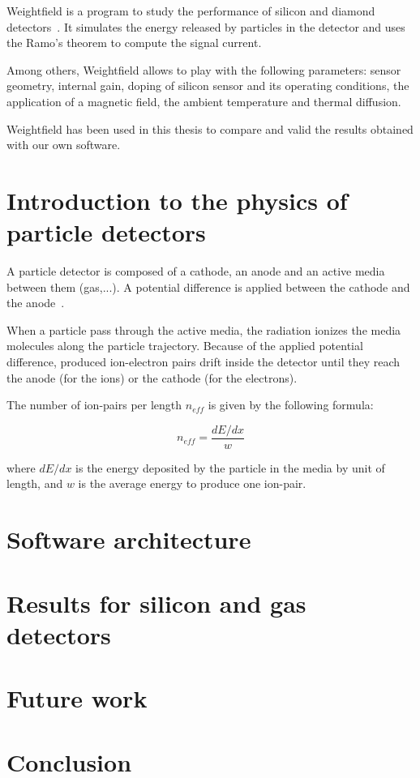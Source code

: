 \documentclass[11pt]{article}
\begin{document}
Weightfield is a program to study the performance of silicon and diamond
detectors~\cite{Cenna2015}. It simulates the energy released by particles in the detector
and uses the Ramo's theorem to compute the signal current.

Among others, Weightfield allows to play with the following parameters:
sensor geometry, internal gain, doping of silicon sensor and its operating
conditions, the application of a magnetic field, the ambient temperature and
thermal diffusion.

Weightfield has been used in this thesis to compare and valid the results
obtained with our own software.

\section{Introduction to the physics of particle detectors}

A particle detector is composed of a cathode, an anode and an active media
between them (gas,...). A potential difference is applied between the cathode
and the anode~\cite{lphy2236}.

When a particle pass through the active media, the radiation ionizes the media
molecules along the particle trajectory.
Because of the applied potential difference,
produced ion-electron pairs drift inside the detector until they reach the anode
(for the ions) or the cathode (for the electrons).

The number of ion-pairs per length $n_{eff}$ is given by the following formula:

\[n_{eff} = \frac{dE/dx}{w} \]

where $dE/dx$ is the energy deposited by the particle in the media by
unit of length, and $w$ is the average energy to produce one ion-pair.

\section{Software architecture}

\section{Results for silicon and gas detectors}

\section{Future work}

\section{Conclusion}

\newpage



\end{document}
